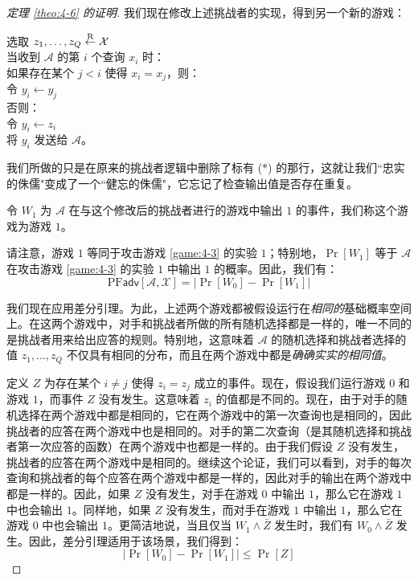 \begin{proof}[定理 \ref{theo:4-6} 的证明]
我们现在修改上述挑战者的实现，得到另一个新的游戏：

\vspace{10pt}

\hspace*{5pt} 选取 $z_1,\dots,z_Q\overset{\rm R}\leftarrow\mathcal{X}$\\
\hspace*{26pt} 当收到 $\mathcal{A}$ 的第 $i$ 个查询 $x_i$ 时：\\
\hspace*{50pt} 如果存在某个 $j<i$ 使得 $x_i=x_j$，则：\\
\hspace*{75pt} 令 $y_i\leftarrow y_j$\\
\hspace*{50pt} 否则：\\
\hspace*{75pt} 令 $y_i\leftarrow z_i$\\
\hspace*{50pt} 将 $y_i$ 发送给 $\mathcal{A}$。

\vspace{10pt}

我们所做的只是在原来的挑战者逻辑中删除了标有 ($*$) 的那行，这就让我们``忠实的侏儒"变成了一个``健忘的侏儒"，它忘记了检查输出值是否存在重复。

令 $W_1$ 为 $\mathcal{A}$ 在与这个修改后的挑战者进行的游戏中输出 $1$ 的事件，我们称这个游戏为游戏 $1$。

请注意，游戏 $1$ 等同于攻击游戏 \ref{game:4-3} 的实验 $1$；特别地，$\Pr[W_1]$ 等于 $\mathcal{A}$ 在攻击游戏 \ref{game:4-3} 的实验 $1$ 中输出 $1$ 的概率。因此，我们有：
\[
\mathrm{PF}\mathsf{adv}[\mathcal{A},\mathcal{X}]
=
\big\lvert
\Pr[W_0]-\Pr[W_1]
\big\rvert
\]

我们现在应用差分引理。为此，上述两个游戏都被假设运行在\emph{相同的}基础概率空间上。在这两个游戏中，对手和挑战者所做的所有随机选择都是一样的，唯一不同的是挑战者用来给出应答的规则。特别地，这意味着 $\mathcal{A}$ 的随机选择和挑战者选择的值 $z_1,\dots,z_Q$ 不仅具有相同的分布，而且在两个游戏中都是\emph{确确实实的相同值}。

定义 $Z$ 为存在某个 $i\neq j$ 使得 $z_i=z_j$ 成立的事件。现在，假设我们运行游戏 $0$ 和游戏 $1$，而事件 $Z$ 没有发生。这意味着 $z_i$ 的值都是不同的。现在，由于对手的随机选择在两个游戏中都是相同的，它在两个游戏中的第一次查询也是相同的，因此挑战者的应答在两个游戏中也是相同的。对手的第二次查询（是其随机选择和挑战者第一次应答的函数）在两个游戏中也都是一样的。由于我们假设 $Z$ 没有发生，挑战者的应答在两个游戏中是相同的。继续这个论证，我们可以看到，对手的每次查询和挑战者的每个应答在两个游戏中都是一样的，因此对手的输出在两个游戏中都是一样的。因此，如果 $Z$ 没有发生，对手在游戏 $0$ 中输出 $1$，那么它在游戏 $1$ 中也会输出 $1$。同样地，如果 $Z$ 没有发生，而对手在游戏 $1$ 中输出 $1$，那么它在游戏 $0$ 中也会输出 $1$。更简洁地说，当且仅当 $W_1\land\bar{Z}$ 发生时，我们有 $W_0\land\bar{Z}$ 发生。因此，差分引理适用于该场景，我们得到：
\[
|\Pr[W_0]-\Pr[W_1]|\leq\Pr[Z]
\]


\end{proof}
